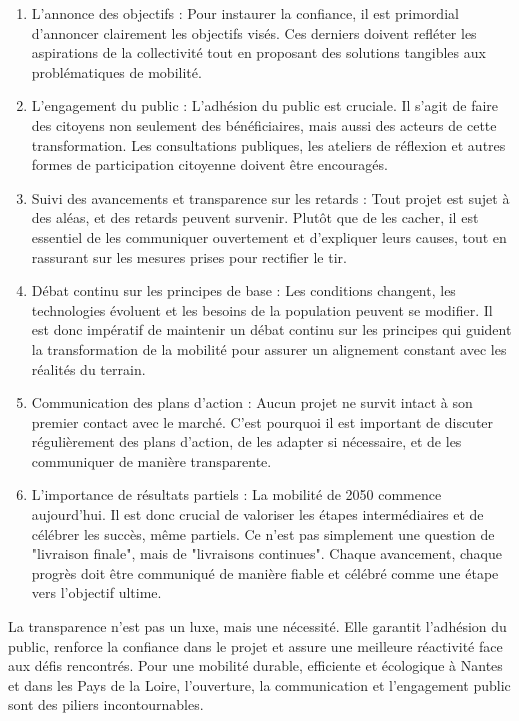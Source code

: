 \begin{enumerate}
\item L'annonce des objectifs : Pour instaurer la confiance, il est
  primordial d'annoncer clairement les objectifs visés. Ces derniers
  doivent refléter les aspirations de la collectivité tout en
  proposant des solutions tangibles aux problématiques de mobilité.
\item L'engagement du public : L'adhésion du public est cruciale. Il
  s'agit de faire des citoyens non seulement des bénéficiaires, mais
  aussi des acteurs de cette transformation. Les consultations
  publiques, les ateliers de réflexion et autres formes de
  participation citoyenne doivent être encouragés.
\item Suivi des avancements et transparence sur les retards : Tout
  projet est sujet à des aléas, et des retards peuvent
  survenir. Plutôt que de les cacher, il est essentiel de les
  communiquer ouvertement et d'expliquer leurs causes, tout en
  rassurant sur les mesures prises pour rectifier le tir.
\item Débat continu sur les principes de base : Les conditions
  changent, les technologies évoluent et les besoins de la population
  peuvent se modifier. Il est donc impératif de maintenir un débat
  continu sur les principes qui guident la transformation de la
  mobilité pour assurer un alignement constant avec les réalités du
  terrain.
\item Communication des plans d'action : Aucun projet ne survit intact
  à son premier contact avec le marché. C'est pourquoi il est
  important de discuter régulièrement des plans d'action, de les
  adapter si nécessaire, et de les communiquer de manière
  transparente.
\item L’importance de résultats partiels : La mobilité de 2050
  commence aujourd'hui. Il est donc crucial de valoriser les étapes
  intermédiaires et de célébrer les succès, même partiels. Ce n'est
  pas simplement une question de "livraison finale", mais de
  "livraisons continues". Chaque avancement, chaque progrès doit être
  communiqué de manière fiable et célébré comme une étape vers
  l'objectif ultime.
\end{enumerate}

La transparence n'est pas un luxe, mais une nécessité. Elle garantit
l'adhésion du public, renforce la confiance dans le projet et assure
une meilleure réactivité face aux défis rencontrés. Pour une mobilité
durable, efficiente et écologique à Nantes et dans les Pays de la
Loire, l'ouverture, la communication et l'engagement public sont des
piliers incontournables.



